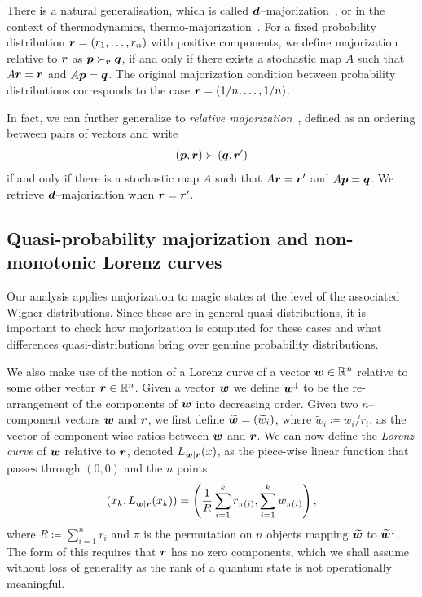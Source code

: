 \documentclass[pra,
aps,
twocolumn,
superscriptaddress,
groupedaddress,
nofootinbib,
reprint
]{revtex4-1}
\begin{document}
There is a natural generalisation, which is called $\bm{d}$--majorization~\cite{Veinott_1971}, or in the context of thermodynamics, thermo-majorization~\cite{cit:horodecki2013}. For a fixed probability distribution $\boldsymbol{r} = (r_1, \dots, r_n)$ with positive components, we define majorization relative to $\boldsymbol{r}$ as $\boldsymbol{p} \succ_{\boldsymbol{r}} \boldsymbol{q}$, if and only if there exists a stochastic map $A$ such that $A\boldsymbol{r} = \boldsymbol{r}$ and $A \boldsymbol{p} = \boldsymbol{q}$. The original majorization condition between probability distributions corresponds to the case $\boldsymbol{r} = (1/n, \dots, 1/n)$. 

In fact, we can further generalize to \emph{relative majorization}~\cite{Blackwell_1953, Ruch_1976, ruch_mixing_1978, Renes_2016, Buscemi_2017, Rethinasamy_2020}, defined as an ordering between pairs of vectors and write 
\begin{equation}
	(\boldsymbol{p},\boldsymbol{r}) \succ (\boldsymbol{q}, \boldsymbol{r}')
\end{equation}
if and only if there is a stochastic map $A$ such that $A\boldsymbol{r} = \boldsymbol{r}'$ and $A\boldsymbol{p} = \boldsymbol{q}$. We retrieve $\bm{d}$--majorization when $\boldsymbol{r} = \boldsymbol{r}'$.

\subsection{Quasi-probability majorization and non-monotonic Lorenz curves}
\label{sec:lc}

Our analysis applies majorization to magic states at the level of the associated Wigner distributions. Since these are in general quasi-distributions, it is important to check how majorization is computed for these cases and what differences quasi-distributions bring over genuine probability distributions.

We also make use of the notion of a Lorenz curve of a vector $\boldsymbol{w} \in \mathbb{R}^n$ relative to some other vector $\boldsymbol{r} \in \mathbb{R}^n$. Given a vector $\boldsymbol{w}$ we define $\boldsymbol{w}^\downarrow$ to be the re-arrangement of the components of $\boldsymbol{w}$ into decreasing order. Given two $n$--component vectors $\boldsymbol{w}$ and $\boldsymbol{r}$, we first define $\widetilde{\boldsymbol{w}}=(\widetilde{w}_i)$, where $\widetilde{w}_i \coloneqq w_i/r_i$, as the vector of component-wise ratios between $\boldsymbol{w}$ and $\boldsymbol{r}$.
We can now define the \emph{Lorenz curve} of $\boldsymbol{w}$ relative to $\boldsymbol{r}$, denoted $L_{\boldsymbol{w}|\boldsymbol{r}}(x)$, as the piece-wise linear function that passes through $(0,0)$ and the $n$ points
\begin{equation}\label{eq:lc}
	(x_k,L_{\boldsymbol{w}|\boldsymbol{r}}(x_k)) =\left( \frac{1}{R}\sum_{i=1}^k r_{\pi(i)}, \sum_{i=1}^k w_{\pi(i)} \right),
\end{equation}
where $R\coloneqq \sum_{i=1}^n r_i$ and $\pi$ is the permutation on $n$ objects mapping $\widetilde{\boldsymbol{w}}$ to $\widetilde{\boldsymbol{w}}^{\downarrow}$. The form of this requires that $\boldsymbol{r}$ has no zero components, which we shall assume without loss of generality as the rank of a quantum state is not operationally meaningful.
\end{document}
